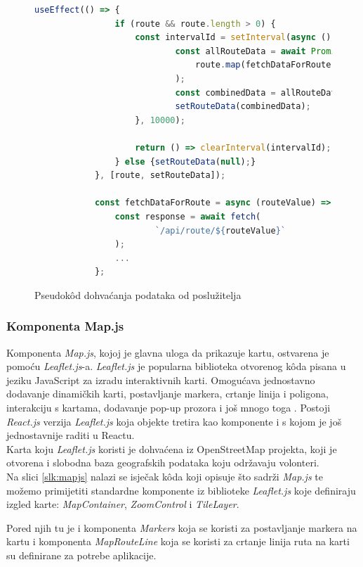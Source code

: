 \documentclass[zavrsnirad]{fer}
\begin{document}
\begin{figure}[H]
	\centering
	\begin{minipage}{0.9\linewidth}
		\begin{lstlisting}[language=JavaScript]			
			useEffect(() => {
				if (route && route.length > 0) {
					const intervalId = setInterval(async () => {
							const allRouteData = await Promise.all(
								route.map(fetchDataForRoute)
							);
							const combinedData = allRouteData.flat();
							setRouteData(combinedData);
					}, 10000);
					
					return () => clearInterval(intervalId);
				} else {setRouteData(null);}
			}, [route, setRouteData]);
			
			const fetchDataForRoute = async (routeValue) => {
				const response = await fetch(
						`/api/route/${routeValue}`
				);
				...
			};
		\end{lstlisting}
	\end{minipage}
	\caption{Pseudok\^od dohvaćanja podataka od poslužitelja}
	\label{slk:dohvatpodataka}
\end{figure}

\subsubsection{Komponenta Map.js}
Komponenta \textit{Map.js}, kojoj je glavna uloga da prikazuje kartu, ostvarena je pomoću \textit{\textit{Leaflet.js}}-a.
\textit{\textit{Leaflet.js}} je popularna biblioteka otvorenog kôda pisana u jeziku JavaScript za izradu interaktivnih karti. Omogućava jednostavno dodavanje dinamičkih karti, postavljanje markera, crtanje linija i poligona, interakciju s kartama, dodavanje pop-up prozora i još mnogo toga \cite{leaflet}.
Postoji \textit{React.js} verzija \textit{\textit{Leaflet.js}} koja objekte tretira kao komponente i s kojom je još jednostavnije raditi u Reactu.\\
Karta koju \textit{\textit{Leaflet.js}} koristi je dohvaćena iz OpenStreetMap projekta, koji je otvorena i slobodna baza geografskih podataka koju održavaju volonteri.\\

Na slici \ref{slk:mapjs} nalazi se isječak k\^oda koji opisuje što sadrži \textit{Map.js} te možemo primijetiti standardne komponente iz biblioteke \textit{Leaflet.js} koje definiraju izgled karte: \textit{MapContainer}, \textit{ZoomControl} i \textit{TileLayer}.

Pored njih tu je i komponenta \textit{Markers} koja se koristi za postavljanje markera na kartu i komponenta \textit{MapRouteLine} koja se koristi za crtanje linija ruta na karti su definirane za potrebe aplikacije.
\end{document}
